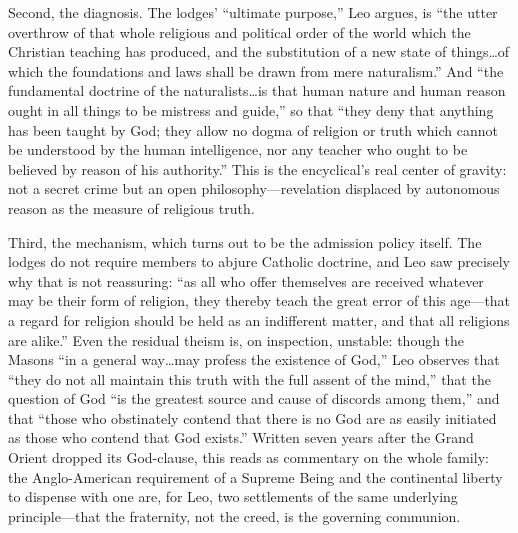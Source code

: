 Second, the diagnosis. The lodges' ``ultimate purpose,'' Leo argues, is ``the utter overthrow of that whole religious and political order of the world which the Christian teaching has produced, and the substitution of a new state of things\ldots of which the foundations and laws shall be drawn from mere naturalism.'' And ``the fundamental doctrine of the naturalists\ldots is that human nature and human reason ought in all things to be mistress and guide,'' so that ``they deny that anything has been taught by God; they allow no dogma of religion or truth which cannot be understood by the human intelligence, nor any teacher who ought to be believed by reason of his authority.'' This is the encyclical's real center of gravity: not a secret crime but an open philosophy---revelation displaced by autonomous reason as the measure of religious truth.

Third, the mechanism, which turns out to be the admission policy itself. The lodges do not require members to abjure Catholic doctrine, and Leo saw precisely why that is not reassuring: ``as all who offer themselves are received whatever may be their form of religion, they thereby teach the great error of this age---that a regard for religion should be held as an indifferent matter, and that all religions are alike.'' Even the residual theism is, on inspection, unstable: though the Masons ``in a general way\ldots may profess the existence of God,'' Leo observes that ``they do not all maintain this truth with the full assent of the mind,'' that the question of God ``is the greatest source and cause of discords among them,'' and that ``those who obstinately contend that there is no God are as easily initiated as those who contend that God exists.'' Written seven years after the Grand Orient dropped its God-clause, this reads as commentary on the whole family: the Anglo-American requirement of a Supreme Being and the continental liberty to dispense with one are, for Leo, two settlements of the same underlying principle---that the fraternity, not the creed, is the governing communion.

